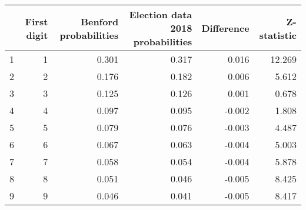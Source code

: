 \begin{tabular}{lrrrrr}
\toprule
{} &  First digit &  Benford probabilities &  Election data 2018 probabilities &  Difference &  Z-statistic \\
\midrule
1 &            1 &                  0.301 &                             0.317 &       0.016 &       12.269 \\
2 &            2 &                  0.176 &                             0.182 &       0.006 &        5.612 \\
3 &            3 &                  0.125 &                             0.126 &       0.001 &        0.678 \\
4 &            4 &                  0.097 &                             0.095 &      -0.002 &        1.808 \\
5 &            5 &                  0.079 &                             0.076 &      -0.003 &        4.487 \\
6 &            6 &                  0.067 &                             0.063 &      -0.004 &        5.003 \\
7 &            7 &                  0.058 &                             0.054 &      -0.004 &        5.878 \\
8 &            8 &                  0.051 &                             0.046 &      -0.005 &        8.425 \\
9 &            9 &                  0.046 &                             0.041 &      -0.005 &        8.417 \\
\bottomrule
\end{tabular}
